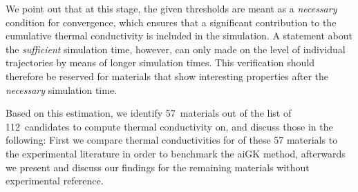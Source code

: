 %
We point out that at this stage, the given thresholds are meant as a \emph{necessary} condition for convergence, which ensures that a significant contribution to the cumulative thermal conductivity is included in the simulation. A statement about the \emph{sufficient} simulation time, however, can only made on the level of individual trajectories by means of longer simulation times. This verification should therefore be reserved for materials that show interesting properties after the \emph{necessary} simulation time.

Based on this estimation, we identify  57~materials out of the list of  112~candidates to compute thermal conductivity on, and discuss those in the following: First we compare thermal conductivities for  of these 57 materials to the experimental literature in order to benchmark the aiGK method, afterwards we present and discuss our findings for the remaining  materials without experimental reference.



